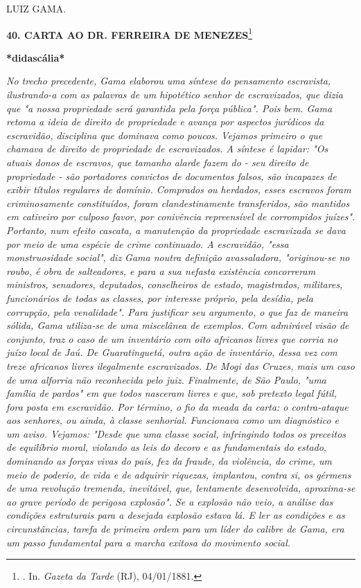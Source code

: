 LUIZ GAMA.

\textbf{40. CARTA AO DR. FERREIRA DE MENEZES}\footnote{. In.
  \emph{Gazeta da Tarde} (RJ), 04/01/1881.}

\textbf{*didascália*}

\emph{No trecho precedente, Gama elaborou uma síntese do pensamento
escravista, ilustrando-a com as palavras de um hipotético senhor de
escravizados, que dizia que "a nossa propriedade será garantida pela
força pública". Pois bem. Gama retoma a ideia de direito de propriedade
e avança por aspectos jurídicos da escravidão, disciplina que dominava
como poucos. Vejamos primeiro o que chamava de direito de propriedade de
escravizados. A síntese é lapidar: "Os atuais donos de escravos, que
tamanho alarde fazem do - seu direito de propriedade - são portadores
convictos de documentos falsos, são incapazes de exibir títulos
regulares de domínio. Comprados ou herdados, esses escravos foram
criminosamente constituídos, foram clandestinamente transferidos, são
mantidos em cativeiro por culposo favor, por conivência repreensível de
corrompidos juízes". Portanto, num efeito cascata, a manutenção da
propriedade escravizada se dava por meio de uma espécie de crime
continuado. A escravidão, "essa monstruosidade social", diz Gama noutra
definição avassaladora, "originou-se no roubo, é obra de salteadores, e
para a sua nefasta existência concorreram ministros, senadores,
deputados, conselheiros de estado, magistrados, militares, funcionários
de todas as classes, por interesse próprio, pela desídia, pela
corrupção, pela venalidade". Para justificar seu argumento, o que faz de
maneira sólida, Gama utiliza-se de uma miscelânea de exemplos. Com
admirável visão de conjunto, traz o caso de um inventário com oito
africanos livres que corria no juízo local de Jaú. De Guaratinguetá,
outra ação de inventário, dessa vez com treze africanos livres
ilegalmente escravizados. De Mogi das Cruzes, mais um caso de uma
alforria não reconhecida pelo juiz. Finalmente, de São Paulo, "uma
família de pardos" em que todos nasceram livres e que, sob pretexto
legal fútil, fora posta em escravidão. Por término, o fio da meada da
carta: o contra-ataque aos senhores, ou ainda, à classe senhorial.
Funcionava como um diagnóstico e um aviso. Vejamos: "Desde que uma
classe social, infringindo todos os preceitos de equilíbrio moral,
violando as leis do decoro e as fundamentais do estado, dominando as
forças vivas do país, fez da fraude, da violência, do crime, um meio de
poderio, de vida e de adquirir riquezas, implantou, contra si, os
gérmens de uma revolução tremenda, inevitável, que, lentamente
desenvolvida, aproxima-se ao grave período de perigosa explosão". Se a
explosão não veio, a análise das condições estruturais para a desejada
explosão estava lá. E ler as condições e as circunstâncias, tarefa de
primeira ordem para um líder do calibre de Gama, era um passo
fundamental para a marcha exitosa do movimento social.}

